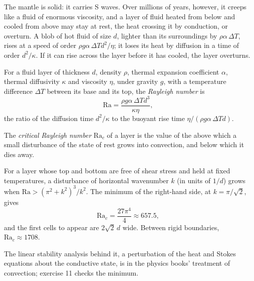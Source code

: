 The mantle is solid: it carries S waves. Over millions of years, however, it
creeps like a fluid of enormous viscosity, and a layer of fluid heated from
below and cooled from above may stay at rest, the heat crossing it by
conduction, or overturn. A blob of hot fluid of size $d$, lighter than its
surroundings by $\rho\alpha\,\Delta T$, rises at a speed of order
$\rho g\alpha\,\Delta T d^2/\eta$; it loses its heat by diffusion in a time of
order $d^2/\kappa$. If it can rise across the layer before it has cooled, the
layer overturns.

\begin{definition}\label{def:b3:mantle-convection:rayleigh}
For a fluid layer of thickness $d$, density $\rho$, thermal expansion
coefficient $\alpha$, thermal diffusivity $\kappa$ and viscosity $\eta$, under
gravity $g$, with a temperature difference $\Delta T$ between its base and its
top, the \emph{Rayleigh number} is
\[
  \mathrm{Ra} = \frac{\rho g\alpha\,\Delta T d^3}{\kappa\eta},
\]
the ratio of the diffusion time $d^2/\kappa$ to the buoyant rise time
$\eta/(\rho g\alpha\,\Delta Td)$.
\end{definition}

\begin{definition}\label{def:b3:mantle-convection:critical}
The \emph{critical Rayleigh number}
$\mathrm{Ra}_c$ of a layer is the value of the  above which a
small disturbance of the state of rest grows into convection, and below which
it dies away.
\end{definition}

\begin{proposition}\label{prop:b3:mantle-convection:onset}
For a layer whose top and bottom are free of shear stress and held at fixed
temperatures, a disturbance of horizontal wavenumber $k$ (in units of $1/d$)
grows when $\mathrm{Ra} > (\pi^2 + k^2)^3/k^2$. The minimum of the right-hand
side, at $k = \pi/\sqrt2$, gives
\[
  \mathrm{Ra}_c = \frac{27\pi^4}{4} \approx 657.5,
\]
and the first cells to appear are $2\sqrt2\,d$ wide. Between rigid boundaries,
$\mathrm{Ra}_c \approx 1708$.
\end{proposition}

\admitted
The linear stability analysis behind it, a perturbation of the heat and Stokes
equations about the conductive state, is in the physics books' treatment of
convection; exercise 11 checks the minimum.

